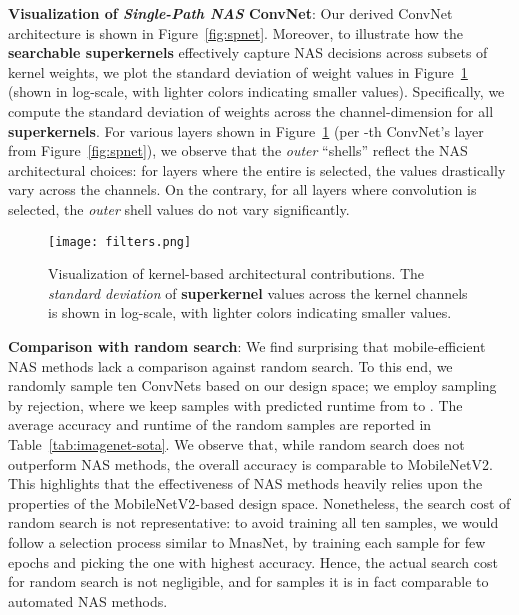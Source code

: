 \documentclass[runningheads]{llncs}
\begin{document}
\textbf{Visualization of \textit{Single-Path NAS} ConvNet}: Our derived 
ConvNet architecture is shown in Figure~\ref{fig:spnet}. Moreover,
to illustrate how the \textbf{searchable superkernels} effectively 
capture NAS decisions across subsets of kernel weights,
we plot the standard deviation of weight values in 
Figure~\ref{fig:kernels} (shown in log-scale, with lighter colors 
indicating smaller values). Specifically, we compute the standard deviation 
of weights across the channel-dimension for all \textbf{superkernels}. 
For various layers shown in Figure~\ref{fig:kernels} (per -th ConvNet's 
layer from Figure~\ref{fig:spnet}), we observe
that the \textit{outer} 
``shells'' reflect the NAS architectural choices: for
layers where the entire  is selected, 
the  
values drastically vary across the channels. On the contrary, 
for all layers where  convolution is selected, 
the \textit{outer} shell values do not vary significantly. 


\begin{figure}[t]
  \centering
  \texttt{[image: filters.png]}
  \caption{Visualization of kernel-based architectural contributions. The 
  \textit{standard deviation} of \textbf{superkernel} values across the kernel
  channels is shown in log-scale, with lighter colors indicating smaller values.}
  \label{fig:kernels}
\end{figure}


\textbf{Comparison with random search}: We find surprising that 
mobile-efficient NAS methods lack a comparison against random search. 
To this end, we randomly sample ten ConvNets based on our design space; we employ 
sampling by rejection, where we keep samples with predicted runtime
from  to . The average accuracy and runtime of the random samples
are reported in Table~\ref{tab:imagenet-sota}. We observe that,
while random search does not outperform NAS methods, the overall accuracy
is comparable to MobileNetV2. This highlights that the effectiveness of
NAS methods heavily relies upon the properties of the MobileNetV2-based 
design space. Nonetheless, the search cost of random search is not 
representative: to avoid training all ten samples,
we would follow a selection process similar to MnasNet, by training each 
sample for few epochs and picking the one with highest accuracy. 
Hence, the actual search cost for random search 
is not negligible, and for  samples it is in fact comparable to 
automated NAS methods.
\end{document}
